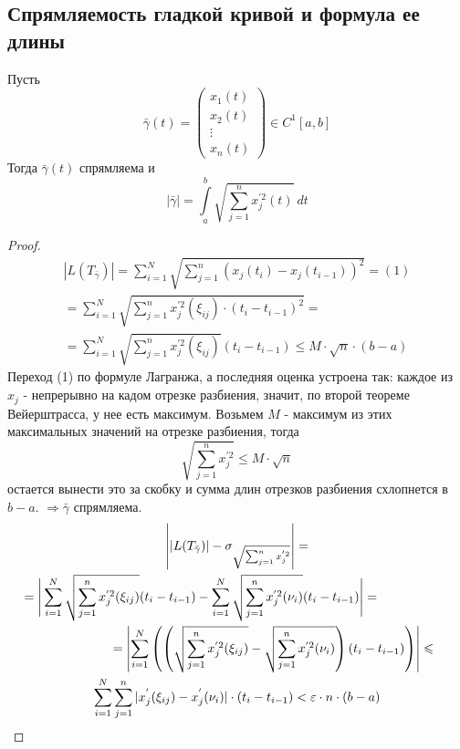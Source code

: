 \subsection{Спрямляемость гладкой кривой и формула ее длины}
\begin{theorem}
    Пусть 
    \[\bar{\gamma}(t) = 
    \begin{pmatrix}
    x_1(t)\\
    x_2(t)\\
    \vdots\\
    x_n(t)
    \end{pmatrix} \in C^1[a,b]\]
    Тогда $\bar{\gamma}(t)$ спрямляема и
    \[|\bar{\gamma}| = \int\limits_{a}^{b} \sqrt{\sum_{j = 1}^{n} x_j^{'2}(t)}\ dt\]
\end{theorem}
\begin{proof}
    \begin{multline*}
        |L(T_{\bar{\gamma}})| = \sum_{i = 1}^{N} \sqrt{ \sum_{j = 1}^{n}(x_j(t_i) - x_j(t_{i - 1}))^2} = (1)\\
        = \sum_{i = 1}^{N} \sqrt{\sum_{j = 1}^{n} x_j^{'2}(\xi_{ij}) \cdot (t_i - t_{i - 1})^2} =\\
        = \sum_{i = 1}^{N} \sqrt{\sum_{j = 1}^{n} x_j^{'2} (\xi_{ij})} (t_i - t_{i - 1}) \leqslant M \cdot \sqrt{n} \cdot (b - a)
    \end{multline*}
    Переход (1) по формуле Лагранжа, а последняя оценка устроена так: каждое из $x_j$ - непрерывно на кадом отрезке разбиения, значит, по второй теореме Вейерштрасса, у нее есть максимум. Возьмем $M$ - максимум из этих максимальных значений на отрезке разбиения, тогда 
    \[\sqrt{\sum\limits_{j=1}^{n}x_j^{'2}}\leq M\cdot \sqrt{n}\]
    остается вынести это за скобку и сумма длин отрезков разбиения схлопнется в $b-a$.
    $\Rightarrow \bar{\gamma}$ спрямляема.
    \newpage
    \begin{multline*}
        \left| |L(T_{\bar{\gamma}})| - \sigma_{\sqrt{\sum_{j = 1}^{n} x_j^{'2}}} \right| =\\
        =\Bigg| \sum_{i = 1}^{N} \sqrt{\sum_{j = 1}^{n} x_j^{'2} (\xi_{ij})}(t_i - t_{i - 1}) - \sum_{i = 1}^{N} \sqrt{\sum_{j = 1}^{n} x_j^{'2} (\nu_{i})}(t_i - t_{i - 1}) \Bigg| =\tab[2cm]\\ 
        \tab[2cm]=\left| \sum_{i=1}^{N} \left( \left( \sqrt{\sum_{j = 1}^{n} x_j^{'2} (\xi_{ij})} - \sqrt{\sum_{j = 1}^{n} x_j^{'2} (\nu_{i})}  \right) (t_i - t_{i - 1}) \right) \right| \leqslant\\
        \sum_{i = 1}^{N} \sum_{j = 1}^{n} |x_j^{'} (\xi_{ij}) - x_j^{'} (\nu_i)| \cdot (t_i - t_{i - 1}) < \epsilon \cdot n \cdot (b - a)

\end{multline*}
\end{proof}
